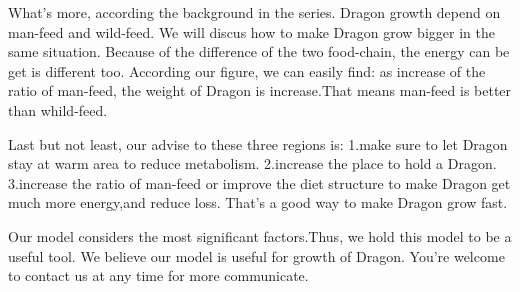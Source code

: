 \documentclass[12pt]{article}
\begin{document}
What's more, according the background in the series. Dragon growth depend on man-feed and wild-feed. We will discus how to make Dragon grow bigger in the same situation. Because of the difference of the two food-chain, the energy can be get is different too. According our figure, we can easily find: as increase of the ratio of man-feed, the weight of Dragon is increase.That means man-feed is better than whild-feed.

Last but not least, our advise to these three regions is: 1.make sure to let Dragon stay at warm area to reduce metabolism. 2.increase the place to hold a Dragon. 3.increase the ratio of man-feed or improve the diet structure to make Dragon get much more energy,and reduce loss. That's a good way to make Dragon grow fast.

Our model considers the most significant factors.Thus, we hold this model to be a useful tool.
We believe our model is useful for growth of Dragon. You’re welcome to contact us at any time for more communicate.
\end{document}
